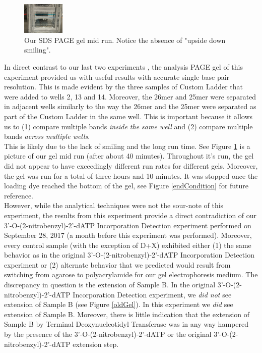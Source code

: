 \documentclass[letterpaper]{article}
\newcommand{\tdt}{Terminal Deoxynucleotidyl Transferase}
\newcommand{\BdATP}{3'-O-(2-nitrobenzyl)-2'-dATP}
\begin{document}
\begin{figure}
\centering
\includegraphics[width=0.18\textwidth]{./resources/midRun.jpg}
\caption{Our SDS PAGE gel mid run. Notice the absence of "upside down smiling".}
\label{noSmile}
\end{figure}

In direct contrast to our last two experiments , the analysis PAGE gel of this experiment provided us with useful results with accurate single base pair resolution.
This is made evident by the three samples of Custom Ladder that were added to wells 2, 13 and 14. Moreover, the 26mer and 25mer were separated in adjacent wells similarly to the way the 26mer and the 25mer were separated as part of the Custom Ladder in the same well. This is important because it allows us to (1) compare multiple bands \textit{inside the same well} and (2) compare multiple bands \textit{across multiple wells}.\\
This is likely due to the lack of smiling and the long run time. See Figure \ref{noSmile} is a picture of our gel mid run (after about 40 minutes). Throughout it's run, the gel did not appear to have exceedingly different run rates for different gels.
Moreover, the gel was run for a total of three hours and 10 minutes. It was stopped once the loading dye reached the bottom of the gel, see Figure \ref{endCondition} for future reference.\\
However, while the analytical techniques were not the sour-note of this experiment, the results from this experiment provide a direct contradiction of our \BdATP{} Incorporation Detection experiment performed on September 28, 2017 (a month before this experiment was performed). Moreover, every control sample (with the exception of D+X) exhibited either (1) the same behavior as in the original \BdATP{} Incorporation Detection experiment or (2) alternate behavior that we predicted would result from switching from agarose to polyacrylamide for our gel electrophoresis medium. The discrepancy in question is the extension of Sample B. In the original \BdATP{} Incorporation Detection experiment, we \textit{did not} see extension of Sample B (see Figure \ref{oldGel}). In this experiment we \textit{did} see extension of Sample B. Moreover, there is little indication that the extension of Sample B by \tdt{} was in any way hampered by the presence of the \BdATP{} or the original \BdATP{} extension step.\\
\end{document}
